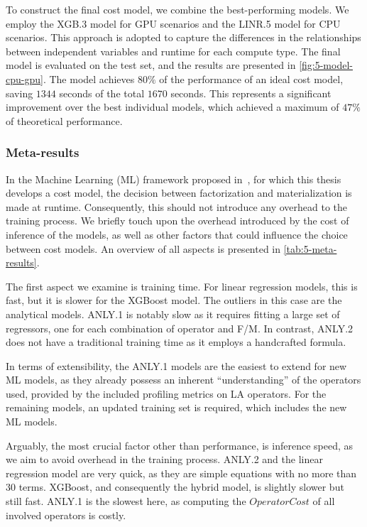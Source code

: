To construct the final cost model, we combine the best-performing models. We employ the XGB.3 model for GPU scenarios and the LINR.5 model for CPU scenarios. This approach is adopted to capture the differences in the relationships between independent variables and runtime for each compute type. The final model is evaluated on the test set, and the results are presented in \autoref{fig:5-model-cpu-gpu}. The model achieves $80\%$ of the performance of an ideal cost model, saving $1344$ seconds of the total $1670$ seconds. This represents a significant improvement over the best individual models, which achieved a maximum of $47\%$ of theoretical performance.

\subsubsection{Meta-results}
In the Machine Learning (ML) framework proposed in~\cite{amalur}, for which this thesis develops a cost model, the decision between factorization and materialization is made at runtime. Consequently, this should not introduce any overhead to the training process. We briefly touch upon the overhead introduced by the cost of inference of the models, as well as other factors that could influence the choice between cost models. An overview of all aspects is presented in \autoref{tab:5-meta-results}.

The first aspect we examine is training time. For linear regression models, this is fast, but it is slower for the XGBoost model. The outliers in this case are the analytical models. ANLY.1 is notably slow as it requires fitting a large set of regressors, one for each combination of operator and F/M. In contrast, ANLY.2 does not have a traditional training time as it employs a handcrafted formula.

In terms of extensibility, the ANLY.1 models are the easiest to extend for new ML models, as they already possess an inherent ``understanding'' of the operators used, provided by the included profiling metrics on LA operators. For the remaining models, an updated training set is required, which includes the new ML models.

Arguably, the most crucial factor other than performance, is inference speed, as we aim to avoid overhead in the training process. ANLY.2 and the linear regression model are very quick, as they are simple equations with no more than $30$ terms. XGBoost, and consequently the hybrid model, is slightly slower but still fast. ANLY.1 is the slowest here, as computing the $OperatorCost$ of all involved operators is costly.

